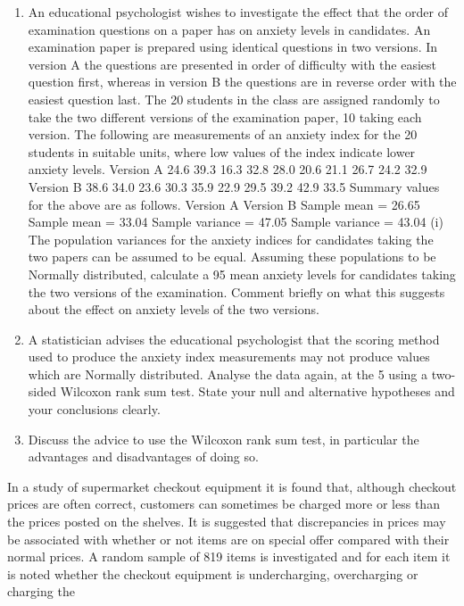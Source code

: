 \begin{enumerate}

\item An educational psychologist wishes to investigate the effect that the order of
examination questions on a paper has on anxiety levels in candidates. An examination
paper is prepared using identical questions in two versions. In version A the questions
are presented in order of difficulty with the easiest question first, whereas in version B
the questions are in reverse order with the easiest question last.
The 20 students in the class are assigned randomly to take the two different versions of
the examination paper, 10 taking each version. The following are measurements of an
anxiety index for the 20 students in suitable units, where low values of the index
indicate lower anxiety levels.
Version A 24.6 39.3 16.3 32.8 28.0 20.6 21.1 26.7 24.2 32.9
Version B 38.6 34.0 23.6 30.3 35.9 22.9 29.5 39.2 42.9 33.5
Summary values for the above are as follows.
Version A Version B
Sample mean = 26.65 Sample mean = 33.04
Sample variance = 47.05 Sample variance = 43.04
(i) The population variances for the anxiety indices for candidates taking the two
papers can be assumed to be equal. Assuming these populations to be
Normally distributed, calculate a 95%
mean anxiety levels for candidates taking the two versions of the examination.
Comment briefly on what this suggests about the effect on anxiety levels of the
two versions.
\item A statistician advises the educational psychologist that the scoring method used
to produce the anxiety index measurements may not produce values which are
Normally distributed. Analyse the data again, at the 5%
using a two-sided Wilcoxon rank sum test. State your null and alternative
hypotheses and your conclusions clearly.
\item Discuss the advice to use the Wilcoxon rank sum test, in particular the
advantages and disadvantages of doing so.
\end{enumerate}
\item In a study of supermarket checkout equipment it is found that, although checkout
prices are often correct, customers can sometimes be charged more or less than the
prices posted on the shelves. It is suggested that discrepancies in prices may be
associated with whether or not items are on special offer compared with their normal
prices. A random sample of 819 items is investigated and for each item it is noted
whether the checkout equipment is undercharging, overcharging or charging the
